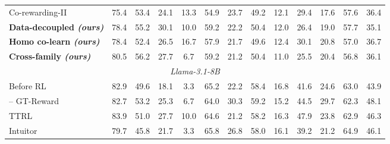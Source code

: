 \begin{table}[t]
\begin{tabular}{lcccccccccccc}
Co-rewarding-II & \cellcolor{heat!6}75.4 & \cellcolor{heat!49}53.4 & \cellcolor{heat!41}24.1 & \cellcolor{heat!48}13.3 & \cellcolor{heat!12}54.9 & \cellcolor{heat!54}23.7 & \cellcolor{heat!6}49.2 & \cellcolor{heat!47}12.1 & \cellcolor{heat!50}29.4 & \cellcolor{heat!23}17.6 & \cellcolor{heat!23}57.6 & \cellcolor{heat!48}36.4 \\
\textbf{Data-decoupled \emph{(ours)}} & \cellcolor{heat!37}78.4 & \cellcolor{heat!55}55.2 & \cellcolor{heat!58}30.1 & \cellcolor{heat!37}10.0 & \cellcolor{heat!58}59.2 & \cellcolor{heat!47}22.2 & \cellcolor{heat!34}50.4 & \cellcolor{heat!44}12.0 & \cellcolor{heat!16}26.4 & \cellcolor{heat!39}19.0 & \cellcolor{heat!27}57.7 & \cellcolor{heat!16}35.1 \\
\textbf{Homo co-learn \emph{(ours)}} & \cellcolor{heat!37}78.4 & \cellcolor{heat!45}52.4 & \cellcolor{heat!48}26.5 & \cellcolor{heat!58}16.7 & \cellcolor{heat!45}57.9 & \cellcolor{heat!45}21.7 & \cellcolor{heat!15}49.6 & \cellcolor{heat!58}12.4 & \cellcolor{heat!58}30.1 & \cellcolor{heat!58}20.8 & \cellcolor{heat!10}57.0 & \cellcolor{heat!58}36.7 \\
\textbf{Cross-family \emph{(ours)}} & \cellcolor{heat!58}80.5 & \cellcolor{heat!58}56.2 & \cellcolor{heat!51}27.7 & \cellcolor{heat!27}6.7 & \cellcolor{heat!58}59.2 & \cellcolor{heat!43}21.2 & \cellcolor{heat!34}50.4 & \cellcolor{heat!6}11.0 & \cellcolor{heat!6}25.5 & \cellcolor{heat!54}20.4 & \cellcolor{heat!6}56.8 & \cellcolor{heat!42}36.1 \\
\midrule
\multicolumn{13}{c}{\textit{Llama-3.1-8B}}\\
\midrule
Before RL & 82.9 & 49.6 & 18.1 & 3.3 & 65.2 & 22.2 & 58.4 & 16.8 & 41.6 & 24.6 & 63.0 & 43.9 \\
\hspace{1em}-- GT-Reward & 82.7 & 53.2 & 25.3 & 6.7 & 64.0 & 30.3 & 59.2 & 15.2 & 44.5 & 29.7 & 62.3 & 48.1 \\
\cmidrule(lr){1-13}
TTRL & \cellcolor{heat!44}83.9 & \cellcolor{heat!34}51.0 & \cellcolor{heat!58}27.7 & \cellcolor{heat!58}10.0 & \cellcolor{heat!6}64.6 & \cellcolor{heat!23}21.2 & \cellcolor{heat!22}58.2 & \cellcolor{heat!19}16.3 & \cellcolor{heat!42}47.9 & \cellcolor{heat!22}23.8 & \cellcolor{heat!48}62.9 & \cellcolor{heat!13}46.3 \\
Intuitor & \cellcolor{heat!8}79.7 & \cellcolor{heat!6}45.8 & \cellcolor{heat!6}21.7 & \cellcolor{heat!6}3.3 & \cellcolor{heat!23}65.8 & \cellcolor{heat!55}26.8 & \cellcolor{heat!19}58.0 & \cellcolor{heat!14}16.1 & \cellcolor{heat!6}39.2 & \cellcolor{heat!6}21.2 & \cellcolor{heat!55}64.9 & \cellcolor{heat!10}46.1 \\

\end{tabular}
\end{table}
